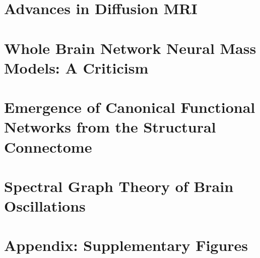 \documentclass[phd,tocprelim]{cornell}
\begin{document}
\chapter{Advances in Diffusion MRI}


\chapter{Whole Brain Network Neural Mass Models: A Criticism}

\chapter{Emergence of Canonical Functional Networks from the Structural Connectome}


\chapter{Spectral Graph Theory of Brain Oscillations}



\appendix
\chapter{Appendix: Supplementary Figures}



\end{document}
